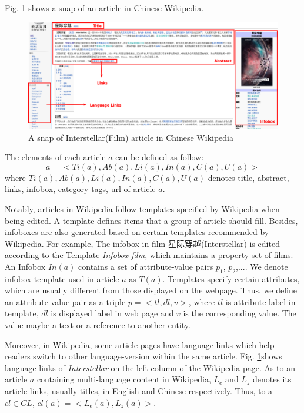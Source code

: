 \documentclass[runningheads,a4paper]{llncs}
\begin{document}
Fig. \ref{fig:interstellar} shows a snap of an article in Chinese Wikipedia.
\begin{figure}[ht]
    \centerline{\includegraphics[width=1\columnwidth]{fig/interstellar}}
    \caption{A snap of Interstellar(Film) article in Chinese Wikipedia}
    \label{fig:interstellar}
\end{figure}%

The elements of each article $a$ can be defined as follow:
\begin{equation}
    a = <Ti(a),Ab(a),Li(a),In(a),C(a),U(a)>
\end{equation}
where $Ti(a),Ab(a),Li(a),In(a),C(a),U(a)$ denotes title, abstract, links, infobox, category tags, url of article $a$.

Notably, articles in Wikipedia follow templates specified by Wikipedia when being edited. A template defines items that a group of article should fill. Besides, infoboxes are also generated based on certain templates recommended by Wikipedia. For example, The infobox in film 星际穿越(Interstellar) is edited according to the Template \emph{Infobox film}, which maintains a property set of films. An Infobox $In(a)$ contains a set of attribute-value pairs {$p_{1}$, $p_{2}$,...}. We denote infobox template used in article $a$ as $T(a)$. Templates specify certain attributes, which are usually different from those displayed on the webpage. Thus, we define an attribute-value pair as a triple $p=<tl,dl,v>$, where $tl$ is attribute label in template, $dl$ is displayed label in web page and $v$ is the corresponding value. The value maybe a text or a reference to another entity.

Moreover, in Wikipedia, some article pages have language links which help readers switch to other language-version within the same article. Fig. \ref{fig:interstellar}shows language links of \emph{Interstellar} on the left column of the Wikipedia page. As to an article $a$ containing multi-language content in Wikipedia, $L_{e}$ and $L_{z}$ denotes its article links, usually titles, in English and Chinese respectively. Thus, to a $cl \in CL$, $cl(a) = <L_{e}(a), L_{z}(a)>$.
\end{document}
